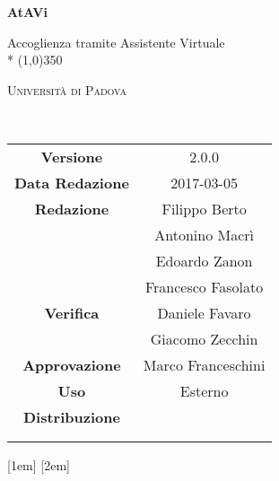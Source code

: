 \documentclass[a4paper,12pt]{article}
\date{\today}
\begin{document}
	\begin{titlepage}
		\centering
		{\huge\bfseries AtAVi\par}
		Accoglienza tramite Assistente Virtuale \\*
		\line(1,0){350} \\
		{\scshape\LARGE Università di Padova \par}
		\vspace{1cm}
		{\scshape\Large \glossarioi\ \par}
		\logo
		\newpage
		\begin{tabular}{c|c}
			{\hfill\textbf{Versione}} 				& 2.0.0			\\ 
			{\hfill\textbf{Data Redazione}} 	& 2017-03-05 		\\ 
			{\hfill\textbf{Redazione}} 			& Filippo Berto \\ & Antonino Macrì \\ & Edoardo Zanon \\ & Francesco Fasolato \\ 
			{\hfill\textbf{Verifica}} 				& Daniele Favaro \\ & Giacomo Zecchin \\ 
			{\hfill\textbf{Approvazione}} 		& Marco Franceschini				\\
			{\hfill\textbf{Uso}} 						& Esterno 			\\
			{\hfill\textbf{Distribuzione}} 		& \vardanega \\ & \cardin \\ & \prop \\
		\end{tabular}
	\end{titlepage}
	
	\pagestyle{myfront}
	\newpage
		

		\newpage		
		{\vskip 0.7cm}
		{\scshape\bfseries\fontsize{2em}{2em}\selectfont}
		{\itshape}
		{}
		{}
		{}
		{}
		{\titlerule\contentspage}
		\tableofcontents
	
		\label{LastFrontPage}
		\pagebreak
			\pagestyle{mymain}

			\titleformat{\section}[block]{\bfseries\filcenter\fontsize{23pt}{20pt}\selectfont}{}{1em}{}

			\printglossary[style=myaltlistgroup, title=, toctitle=Glossario dei termini]
			\glsaddall

		\label{LastPage}
\end{document}
